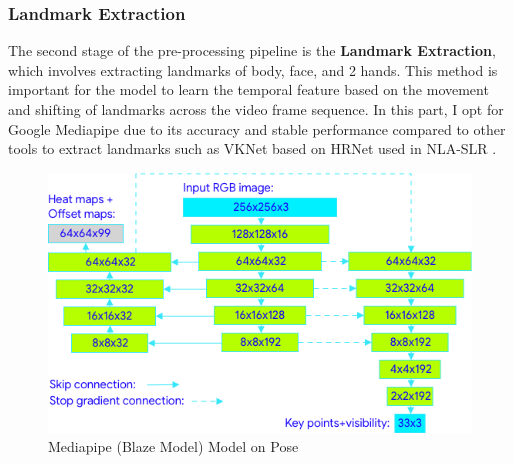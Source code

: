 \documentclass{article}
\begin{document}
\subsubsection{Landmark Extraction}
The second stage of the pre-processing pipeline is the \textbf{Landmark Extraction}, which involves extracting landmarks of body, face, and 2 hands. This method is important for the model to learn the temporal feature based on the movement and shifting of landmarks across the video frame sequence. In this part, I opt for Google Mediapipe \cite{mediapipe_holistic_landmarker} due to its accuracy and stable performance compared to other tools to extract landmarks such as VKNet \cite{zuo2023natural} based on HRNet \cite{sun2019deep} used in NLA-SLR \cite{zuo2023natural}.

\begin{figure}[H]
    \centering
    \includegraphics[width=0.85\linewidth]{Fig/PoseTrackerNet.png}
    \caption{Mediapipe (Blaze Model) Model on Pose}
    \label{fig:posemodel}
\end{figure}
\end{document}
